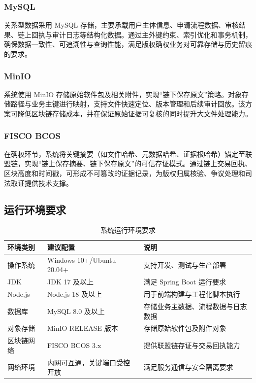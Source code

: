 \documentclass[UTF8,a4paper,12pt]{ctexart}
\begin{document}
\subsubsection{MySQL}
关系型数据采用 MySQL 存储，主要承载用户主体信息、申请流程数据、审核结果、链上回执与审计日志等结构化数据。通过主外键约束、索引优化和事务机制，确保数据一致性、可追溯性与查询性能，满足版权确权业务对可靠存储与历史留痕的要求。

\subsubsection{MinIO}
系统使用 MinIO 存储原始软件包及相关附件，实现“链下保存原文”策略。对象存储路径与业务主键进行映射，支持文件快速定位、版本管理和后续审计回放。该方案可降低区块链存储成本，并在保证原始证据可复核的同时提升大文件处理能力。

\subsubsection{FISCO BCOS}
在确权环节，系统将关键摘要（如文件哈希、元数据哈希、证据根哈希）锚定至联盟链，实现“链上保存摘要、链下保存原文”的可信存证模式。通过链上交易回执、区块高度和时间戳，可形成不可篡改的证据记录，为版权归属核验、争议处理和司法取证提供技术支撑。

\subsection{运行环境要求}
\begingroup
\setlength{\heavyrulewidth}{1pt}
\setlength{\lightrulewidth}{0.5pt}
\begin{table}[H]
  \centering
  \caption{系统运行环境要求}
  \begin{tabularx}{0.95\textwidth}{lYY}
    \toprule
    环境类别 & 建议配置 & 说明 \\
    \midrule
    操作系统 & Windows 10+/Ubuntu 20.04+ & 支持开发、测试与生产部署 \\
    JDK & JDK 17 及以上 & 满足 Spring Boot 运行要求 \\
    Node.js & Node.js 18 及以上 & 用于前端构建与工程化脚本执行 \\
    数据库 & MySQL 8.0 及以上 & 存储业务主数据、流程数据与日志数据 \\
    对象存储 & MinIO RELEASE 版本 & 存储原始软件包及附件对象 \\
    区块链网络 & FISCO BCOS 3.x & 提供联盟链存证与交易回执能力 \\
    网络环境 & 内网可互通，关键端口受控开放 & 满足服务通信与安全隔离要求 \\
    \bottomrule
  \end{tabularx}
\end{table}
\endgroup
\end{document}
